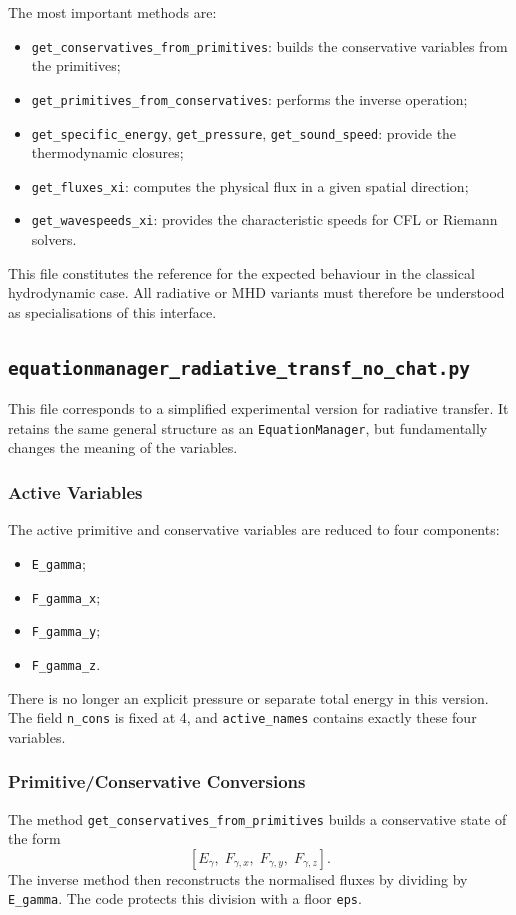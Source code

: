 \documentclass[a4paper, 11pt]{article}
\begin{document}
The most important methods are:
\begin{itemize}
    \item \texttt{get\_conservatives\_from\_primitives}: builds the conservative variables from the primitives;
    \item \texttt{get\_primitives\_from\_conservatives}: performs the inverse operation;
    \item \texttt{get\_specific\_energy}, \texttt{get\_pressure}, \texttt{get\_sound\_speed}: provide the thermodynamic closures;
    \item \texttt{get\_fluxes\_xi}: computes the physical flux in a given spatial direction;
    \item \texttt{get\_wavespeeds\_xi}: provides the characteristic speeds for CFL or Riemann solvers.
\end{itemize}

This file constitutes the reference for the expected behaviour in the classical hydrodynamic case. All radiative or MHD variants must therefore be understood as specialisations of this interface.

\subsection{\texttt{equationmanager\_radiative\_transf\_no\_chat.py}}
This file corresponds to a simplified experimental version for radiative transfer. It retains the same general structure as an \texttt{EquationManager}, but fundamentally changes the meaning of the variables.

\subsubsection*{Active Variables}
The active primitive and conservative variables are reduced to four components:
\begin{itemize}
    \item \texttt{E\_gamma};
    \item \texttt{F\_gamma\_x};
    \item \texttt{F\_gamma\_y};
    \item \texttt{F\_gamma\_z}.
\end{itemize}

There is no longer an explicit pressure or separate total energy in this version. The field \texttt{n\_cons} is fixed at 4, and \texttt{active\_names} contains exactly these four variables.

\subsubsection*{Primitive/Conservative Conversions}
The method \texttt{get\_conservatives\_from\_primitives} builds a conservative state of the form
\[
    \left[E_\gamma,\; F_{\gamma,x},\;F_{\gamma,y},\; F_{\gamma,z}\right].
\]
The inverse method then reconstructs the normalised fluxes by dividing by \texttt{E\_gamma}. The code protects this division with a floor \texttt{eps}.
\end{document}
